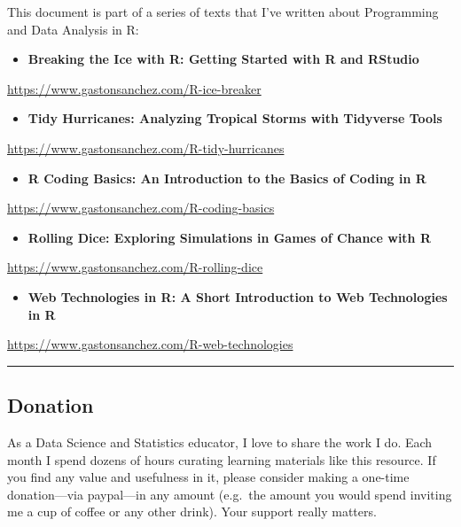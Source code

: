 \documentclass[
]{book}
\providecommand{\tightlist}{%
  \setlength{\itemsep}{0pt}\setlength{\parskip}{0pt}}
\begin{document}
This document is part of a series of texts that I've written about Programming
and Data Analysis in R:

\begin{itemize}
\tightlist
\item
  \textbf{Breaking the Ice with R: Getting Started with R and RStudio}
\end{itemize}

\url{https://www.gastonsanchez.com/R-ice-breaker}

\begin{itemize}
\tightlist
\item
  \textbf{Tidy Hurricanes: Analyzing Tropical Storms with Tidyverse Tools}
\end{itemize}

\url{https://www.gastonsanchez.com/R-tidy-hurricanes}

\begin{itemize}
\tightlist
\item
  \textbf{R Coding Basics: An Introduction to the Basics of Coding in R}
\end{itemize}

\url{https://www.gastonsanchez.com/R-coding-basics}

\begin{itemize}
\tightlist
\item
  \textbf{Rolling Dice: Exploring Simulations in Games of Chance with R}
\end{itemize}

\url{https://www.gastonsanchez.com/R-rolling-dice}

\begin{itemize}
\tightlist
\item
  \textbf{Web Technologies in R: A Short Introduction to Web Technologies in R}
\end{itemize}

\url{https://www.gastonsanchez.com/R-web-technologies}

\begin{center}\rule{0.5\linewidth}{0.5pt}\end{center}

\hypertarget{donation}{%
\subsection*{Donation}\label{donation}}

As a Data Science and Statistics educator, I love to share the work I do.
Each month I spend dozens of hours curating learning materials like this resource.
If you find any value and usefulness in it, please consider making
a one-time donation---via paypal---in any amount (e.g.~the amount you would spend inviting me a cup of coffee or any other drink). Your support really matters.
\end{document}
